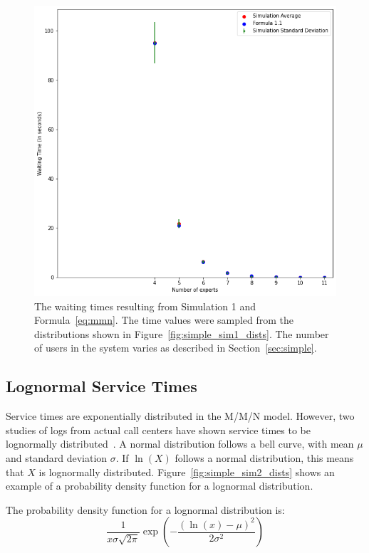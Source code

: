 \begin{figure}[H]
  \includegraphics[width=\textwidth]{figures/montecarlo/independent_calls_expon.png}
  \caption{
    The waiting times resulting from Simulation 1 and Formula~\ref{eq:mmn}.
    The time values were sampled from the distributions shown in
    Figure~\ref{fig:simple_sim1_dists}.
    The number of users in the system varies as described in
    Section~\ref{sec:simple}.
  }\label{fig:simple_sim1_results}
\end{figure}

\subsection{Lognormal Service Times}\label{sec:sim_lognormal}

Service times are exponentially distributed in the M/M/N model.
However, two studies of logs from actual call centers have shown service times
to be lognormally distributed~\cite{queue1, queue2}.
A normal distribution follows a bell curve, with mean $\mu$ and standard
deviation $\sigma$.
If $\ln{(X)}$ follows a normal distribution, this means that $X$ is lognormally
distributed.
Figure~\ref{fig:simple_sim2_dists} shows an example of a probability density
function for a lognormal distribution.

The probability density function for a lognormal distribution is:
\[
  \frac{1}{x \sigma \sqrt{2 \pi}}
  \exp{\left( - \frac{\left( \ln(x) - \mu \right)^2}{2 \sigma^2} \right)}
\]

